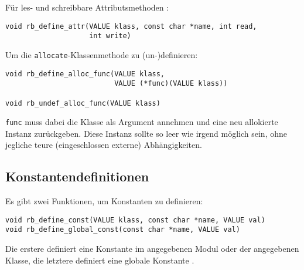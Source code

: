 Für les- und schreibbare Attributsmethoden :

\begin{lstlisting}
void rb_define_attr(VALUE klass, const char *name, int read,
                    int write)
\end{lstlisting}

Um die \verb+allocate+-Klassenmethode zu (un-)definieren:

\begin{lstlisting}
void rb_define_alloc_func(VALUE klass,
                          VALUE (*func)(VALUE klass))

void rb_undef_alloc_func(VALUE klass)
\end{lstlisting}

\noindent\verb+func+ muss dabei die Klasse als Argument annehmen und eine neu
allokierte Instanz zurückgeben. Diese Instanz sollte so leer wie
irgend möglich sein, ohne jegliche teure (eingeschlossen externe)
Abhängigkeiten.


\subsection{Konstantendefinitionen}

Es gibt zwei Funktionen, um Konstanten zu definieren: 

\begin{lstlisting}
void rb_define_const(VALUE klass, const char *name, VALUE val)
void rb_define_global_const(const char *name, VALUE val)
\end{lstlisting}

\noindent Die erstere definiert eine Konstante im angegebenen Modul oder der
angegebenen Klasse, die letztere definiert eine globale Konstante
.

